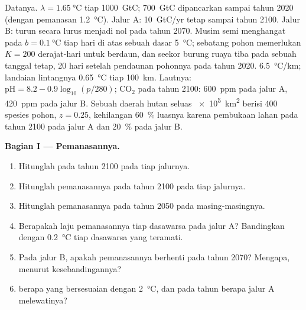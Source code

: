 \begin{problem}
\label{pb:b2:global-change:1}
Datanya. $\lambda = \qty{1.65}{\celsius}$ tiap \qty{1000}{GtC};
\qty{700}{GtC} dipancarkan sampai tahun 2020 (dengan pemanasan
\qty{1.2}{\celsius}). Jalur A: \qty{10}{GtC/yr} tetap sampai tahun
2100. Jalur B: turun secara lurus menjadi nol pada tahun 2070. Musim
semi menghangat pada $b = \qty{0.1}{\celsius}$ tiap hari di atas sebuah
dasar \qty{5}{\celsius}; sebatang pohon memerlukan $K = 200$
derajat-hari untuk berdaun, dan seekor burung ruaya tiba pada sebuah
tanggal tetap, 20 hari setelah pendaunan pohonnya pada tahun 2020.  \qty{6.5}{\celsius/km}; landaian lintangnya
\qty{0.65}{\celsius} tiap \qty{100}{km}. Lautnya: $\mathrm{pH} = 8.2 - 0.9\log_{10}(p/280)$;
\ensuremath{\mathrm{CO_2}} pada tahun 2100: \qty{600}{ppm} pada jalur A, \qty{420}{ppm} pada jalur B.
Sebuah daerah hutan seluas \qty{e5}{km^2} berisi 400 spesies pohon, $z = 0.25$,
kehilangan \qty{60}{\%} luasnya karena pembukaan lahan pada tahun 2100 pada jalur A dan
\qty{20}{\%} pada jalur B.

\medskip
\noindent\textbf{Bagian I --- Pemanasannya.}
\begin{enumerate}
  \item Hitunglah  pada tahun 2100 pada tiap
        jalurnya.
  \item Hitunglah pemanasannya pada tahun 2100 pada tiap jalurnya.
  \item Hitunglah pemanasannya pada tahun 2050 pada masing-masingnya.
  \item Berapakah laju pemanasannya tiap dasawarsa pada jalur A?
        Bandingkan dengan \qty{0.2}{\celsius} tiap dasawarsa yang
        teramati.
  \item Pada jalur B, apakah pemanasannya berhenti pada tahun 2070?
        Mengapa, menurut kesebandingannya?
  \item {} berapa yang bersesuaian dengan
        \qty{2}{\celsius}, dan pada tahun berapa jalur A melewatinya?
\end{enumerate}


\end{problem}
